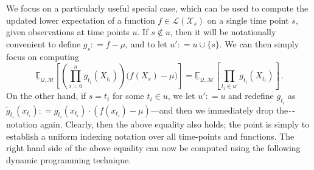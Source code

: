 \documentclass[twoside,11pt]{article}
\newcommand{\states}{\mathcal{X}}
\newcommand{\lexp}{\underline{\mathbb{E}}_{\rateset,\mathcal{M}}}
\newcommand{\gambles}{\mathcal{L}}
\newcommand{\rateset}{\mathcal{Q}}
\newcommand{\coloneqq}{:\!=}
\begin{document}
We focus on a particularly useful special case, which can be used to compute the updated lower expectation of a function $f\in\gambles(\states_s)$ on a single time point $s$, given observations at time points $u$. If $s\notin u$, then it will be notationally convenient to define $g_s\coloneqq f - \mu$, and to let $u'\coloneqq u\cup \{s\}$. We can then simply focus on computing
\begin{equation*}
\lexp\left[ \left(\prod_{i=0}^ng_{t_i}(X_{t_i})\right)\bigl(f(X_s) - \mu\bigr) \right] = \lexp\left[ \prod_{t_i\in u'}g_{t_i}(X_{t_i})\right]\,.
\end{equation*}
On the other hand, if $s = t_i$ for some $t_i\in u$, we let $u'\coloneqq u$ and redefine $g_{t_i}$ as $\tilde{g}_{t_i}(x_{t_i})\coloneqq g_{t_i}(x_{t_i})\cdot (f(x_{t_i})-\mu)$---and then we immediately drop the $\tilde\,$-notation again. Clearly, then the above equality also holds; the point is simply to establish a uniform indexing notation over all time-points and functions. The right hand side of the above equality can now be computed using the following dynamic programming technique. 
\end{document}
